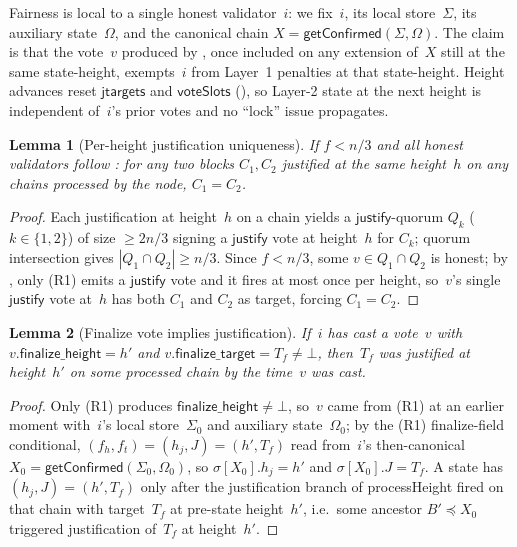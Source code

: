 \documentclass{article}
\newcommand{\just}{\ensuremath{\mathsf{justify}}\xspace}
\newcommand{\finalizeHeight}{\mathsf{finalize\_height}}
\newcommand{\finalizeTarget}{\mathsf{finalize\_target}}
\newcommand{\jtargets}{\mathsf{jtargets}}
\newcommand{\voteSlots}{\mathsf{voteSlots}}
\newcommand{\processHeight}{\textsf{processHeight}\xspace}
\newcommand{\getConfirmed}{\textsf{getConfirmed}\xspace}
\theoremstyle{plain}
\newtheorem{lemma}{Lemma}
\theoremstyle{definition}
\theoremstyle{remark}
\begin{document}
Fairness is local to a single honest validator~$i$: we fix~$i$, its local store~$\Sigma$, its auxiliary state~$\Omega$, and the canonical chain $X = \getConfirmed(\Sigma, \Omega)$.
The claim is that the vote~$v$ produced by , once included on any extension of~$X$ still at the same state-height, exempts~$i$ from Layer~1 penalties at that state-height.
Height advances reset $\jtargets$ and $\voteSlots$ (), so Layer-2 state at the next height is independent of~$i$'s prior votes and no ``lock'' issue propagates.

\begin{lemma}[Per-height justification uniqueness]\label{lem:just-unique-height}
If $f < n/3$ and all honest validators follow : for any two blocks $C_1, C_2$ justified at the same height~$h$ on any chains processed by the node, $C_1 = C_2$.
\end{lemma}

\begin{proof}
Each justification at height~$h$ on a chain yields a \just-quorum $Q_k$ ($k \in \{1, 2\}$) of size $\geq 2n/3$ signing a \just vote at height~$h$ for $C_k$; quorum intersection gives $|Q_1 \cap Q_2| \geq n/3$.
Since $f < n/3$, some $v \in Q_1 \cap Q_2$ is honest; by , only (R1) emits a \just vote and it fires at most once per height, so~$v$'s single \just vote at~$h$ has both $C_1$ and $C_2$ as target, forcing $C_1 = C_2$.
\end{proof}

\begin{lemma}[Finalize vote implies justification]\label{lem:no-finalize-without-just}
If~$i$ has cast a vote~$v$ with $v.\finalizeHeight = h'$ and $v.\finalizeTarget = T_f \neq \bot$, then~$T_f$ was justified at height~$h'$ on some processed chain by the time~$v$ was cast.
\end{lemma}

\begin{proof}
Only (R1) produces $\finalizeHeight \neq \bot$, so~$v$ came from (R1) at an earlier moment with~$i$'s local store~$\Sigma_0$ and auxiliary state~$\Omega_0$; by the (R1) finalize-field conditional, $(f_h, f_t) = (h_j, J) = (h', T_f)$ read from~$i$'s then-canonical $X_0 = \getConfirmed(\Sigma_0, \Omega_0)$, so $\sigma[X_0].h_j = h'$ and $\sigma[X_0].J = T_f$.
A state has $(h_j, J) = (h', T_f)$ only after the justification branch of \processHeight fired on that chain with target~$T_f$ at pre-state height~$h'$, i.e.\ some ancestor $B' \preceq X_0$ triggered justification of~$T_f$ at height~$h'$.
\end{proof}
\end{document}
